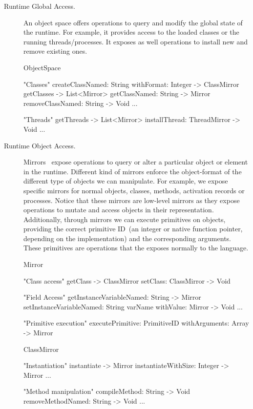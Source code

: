 \begin{description}
\item[Runtime Global Access.] An object space offers operations to query and modify the global state of the runtime. For example, it provides access to the loaded classes or the running threads/processes. It exposes as well operations to install new and remove existing ones.

\begin{code}
ObjectSpace {
    "Classes"
    createClassNamed: String withFormat: Integer -> ClassMirror
    getClasses -> List<Mirror>
    getClassNamed: String -> Mirror
    removeClassNamed: String -> Void
    ...

    "Threads"
    getThreads -> List<Mirror>
    installThread: ThreadMirror -> Void
    ...
}
\end{code}

\item[Runtime Object Access.] Mirrors~\cite{Brac04b} expose operations to query or alter a particular object or element in the runtime. Different kind of mirrors enforce the object-format of the different type of objects we can manipulate. For example, we expose specific mirrors for normal objects, classes, methods, activation records or processes. Notice that these mirrors are low-level mirrors as they expose operations to mutate and access objects in their \VM representation. Additionally, through mirrors we can execute \VM primitives on objects, providing the correct primitive ID~(an integer or native function pointer, depending on the implementation) and the corresponding arguments. These primitives are operations that the \VM exposes normally to the language.

\begin{code}
Mirror {
    "Class access"
    getClass -> ClassMirror
    setClass: ClassMirror -> Void

    "Field Access"
    getInstanceVariableNamed: String -> Mirror
    setInstanceVariableNamed: String varName withValue: Mirror -> Void
    ...
    
    "Primitive execution"
    executePrimitive: PrimitiveID withArguments: Array -> Mirror
}
\end{code}

\begin{code}
ClassMirror {
    "Instantiation"
    instantiate -> Mirror
    instantiateWithSize: Integer -> Mirror
    ...

    "Method manipulation"    
    compileMethod: String -> Void
    removeMethodNamed: String -> Void
    ...
}
\end{code}

\end{description}


